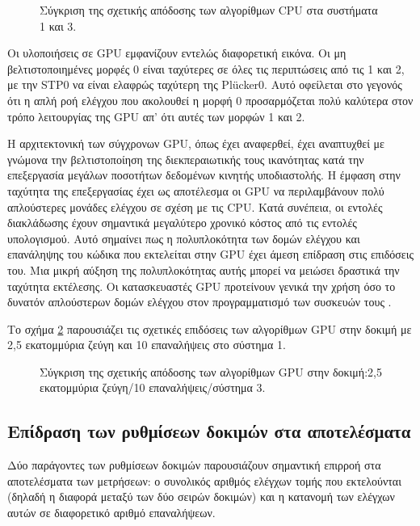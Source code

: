 \begin{figure}[b]
\begin{center}
\scalebox{0.9}
{

}
\scalebox{0.9}
{

}
\end{center}
\caption{Σύγκριση της σχετικής απόδοσης των αλγορίθμων CPU στα συστήματα 1 και 3.}
\label{effcpuexample}
\end{figure}
 
Οι υλοποιήσεις σε GPU εμφανίζουν εντελώς διαφορετική εικόνα. Οι μη βελτιστοποιημένες μορφές 0 είναι ταχύτερες σε όλες τις περιπτώσεις από τις 1 και 2, με την STP0 να είναι ελαφρώς ταχύτερη της Plücker0. Αυτό οφείλεται στο γεγονός ότι η απλή ροή ελέγχου που ακολουθεί η μορφή 0 προσαρμόζεται πολύ καλύτερα στον τρόπο λειτουργίας της GPU απ' ότι αυτές των μορφών 1 και 2.

Η αρχιτεκτονική των σύγχρονων GPU, όπως έχει αναφερθεί, έχει αναπτυχθεί με γνώμονα την βελτιστοποίηση της διεκπεραιωτικής τους ικανότητας κατά την επεξεργασία μεγάλων ποσοτήτων δεδομένων κινητής υποδιαστολής. Η έμφαση στην ταχύτητα της επεξεργασίας έχει ως αποτέλεσμα οι GPU να περιλαμβάνουν πολύ απλούστερες μονάδες ελέγχου σε σχέση με τις CPU. Κατά συνέπεια, οι εντολές διακλάδωσης έχουν σημαντικά μεγαλύτερο χρονικό κόστος από τις εντολές υπολογισμού. Αυτό σημαίνει πως η πολυπλοκότητα των δομών ελέγχου και επανάληψης του κώδικα που εκτελείται στην GPU έχει άμεση επίδραση στις επιδόσεις του. Μια μικρή αύξηση της πολυπλοκότητας αυτής μπορεί να μειώσει δραστικά την ταχύτητα εκτέλεσης. Οι κατασκευαστές GPU προτείνουν γενικά την χρήση όσο το δυνατόν απλούστερων δομών ελέγχου στον προγραμματισμό των συσκευών τους \cite{ATIOpenCL}.

Το σχήμα \ref{effgpuexample} παρουσιάζει τις σχετικές επιδόσεις των αλγορίθμων GPU στην δοκιμή με 2,5 εκατομμύρια ζεύγη και 10 επαναλήψεις στο σύστημα 1.

\begin{figure}[b]
\begin{center}
\scalebox{0.9}
{

}
\end{center}
\caption{Σύγκριση της σχετικής απόδοσης των αλγορίθμων GPU στην δοκιμή:2,5 εκατομμύρια ζεύγη/10 επαναλήψεις/σύστημα 3.}
\label{effgpuexample}
\end{figure}

\subsection{Επίδραση των ρυθμίσεων δοκιμών στα αποτελέσματα}
\noindent Δύο παράγοντες των ρυθμίσεων δοκιμών παρουσιάζουν σημαντική επιρροή στα αποτελέσματα των μετρήσεων: ο συνολικός αριθμός ελέγχων τομής που εκτελούνται (δηλαδή η διαφορά μεταξύ των δύο σειρών δοκιμών) και η κατανομή των ελέγχων αυτών σε διαφορετικό αριθμό επαναλήψεων.


